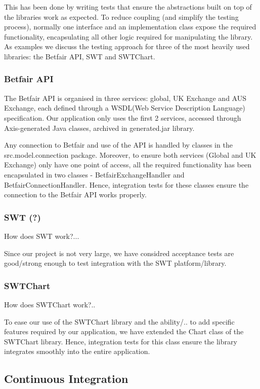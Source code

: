 \documentclass[10pt]{article}
\begin{document}
This has been done by writing tests that ensure the abstractions built on top of the libraries work as expected. To reduce coupling (and simplify the testing process), normally one interface and an implementation class expose the required functionality, encapsulating all other logic required for manipulating the library. As examples we discuss the testing approach for three of the most heavily used libraries: the Betfair API, SWT and SWTChart.

\subsubsection{Betfair API}

The Betfair API is organised in three services: global, UK Exchange and AUS Exchange, each defined through a WSDL(Web Service Description Language) specification. Our application only uses the first 2 services, accessed through Axis-generated Java classes, archived in generated.jar library.

Any connection to Betfair and use of the API is handled by classes in the src.model.connection package. Moreover, to ensure both services (Global and UK Exchange) only have one point of access, all the required functionality has been encapsulated in two classes - BetfairExchangeHandler and BetfairConnectionHandler. Hence, integration tests for these classes ensure the connection to the Betfair API works properly.

\subsubsection{SWT (?)}

How does SWT work?...

Since our project is not very large, we have considred acceptance tests are good/strong enough to test integration with the SWT platform/library.

\subsubsection{SWTChart}

How does SWTChart work?..

To ease our use of the SWTChart library and the ability/.. to add specific features required by our application, we have extended the Chart class of the SWTChart library. Hence, integration tests for this class ensure the library integrates smoothly into the entire application. 


\subsection{Continuous Integration}
\end{document}
